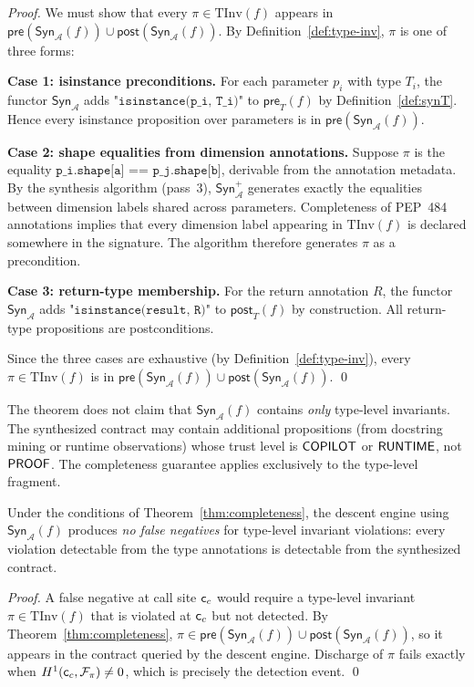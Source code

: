 \documentclass[11pt]{article}
\newcommand{\Syn}{\mathsf{Syn}}            %
\newcommand{\Pre}{\mathsf{pre}}            %
\newcommand{\Post}{\mathsf{post}}          %
\newcommand{\TypeAnn}{\mathcal{A}}         %
\newcommand{\TypeInv}{\mathrm{TInv}}       %
\newcommand{\SynT}{\Syn_{\TypeAnn}}        %
\begin{document}
\begin{proof}
We must show that every $\pi \in \TypeInv(f)$ appears in
$\Pre(\SynT(f)) \cup \Post(\SynT(f))$.  By
Definition~\ref{def:type-inv}, $\pi$ is one of three forms:

\textbf{Case 1: isinstance preconditions.}
For each parameter $p_i$ with type $T_i$, the functor $\SynT$ adds
$\texttt{"isinstance(p\_i, T\_i)"}$ to $\Pre_T(f)$ by
Definition~\ref{def:synT}.  Hence every isinstance proposition over
parameters is in $\Pre(\SynT(f))$.

\textbf{Case 2: shape equalities from dimension annotations.}
Suppose $\pi$ is the equality $\texttt{p\_i.shape[a] == p\_j.shape[b]}$,
derivable from the annotation metadata.  By the synthesis algorithm
(pass~3), $\SynT^+$ generates exactly the equalities between dimension
labels shared across parameters.  Completeness of PEP~484 annotations
implies that every dimension label appearing in $\TypeInv(f)$ is
declared somewhere in the signature.  The algorithm therefore generates
$\pi$ as a precondition.

\textbf{Case 3: return-type membership.}
For the return annotation $R$, the functor $\SynT$ adds
$\texttt{"isinstance(result, R)"}$ to $\Post_T(f)$ by construction.
All return-type propositions are postconditions.

Since the three cases are exhaustive (by Definition~\ref{def:type-inv}),
every $\pi \in \TypeInv(f)$ is in
$\Pre(\SynT(f)) \cup \Post(\SynT(f))$.  \qed
\end{proof}

\begin{remark}
The theorem does not claim that $\SynT(f)$ contains \emph{only}
type-level invariants.  The synthesized contract may contain
additional propositions (from docstring mining or runtime observations)
whose trust level is $\mathsf{COPILOT}$ or $\mathsf{RUNTIME}$, not $\mathsf{PROOF}$.  The
completeness guarantee applies exclusively to the type-level fragment.
\end{remark}

\begin{corollary}\label{cor:no-false-negatives}
Under the conditions of Theorem~\ref{thm:completeness}, the descent
engine using $\SynT(f)$ produces \emph{no false negatives} for
type-level invariant violations: every violation detectable from the
type annotations is detectable from the synthesized contract.
\end{corollary}

\begin{proof}
A false negative at call site $\mathsf{c}_c$ would require a type-level
invariant $\pi \in \TypeInv(f)$ that is violated at $\mathsf{c}_c$ but
not detected.  By Theorem~\ref{thm:completeness}, $\pi \in
\Pre(\SynT(f)) \cup \Post(\SynT(f))$, so it appears in the contract
queried by the descent engine.  Discharge of $\pi$ fails exactly when
$H^{1}(\mathsf{c}_c, \mathcal{F}_\pi) \ne 0$, which is precisely the
detection event.  \qed
\end{proof}
\end{document}
